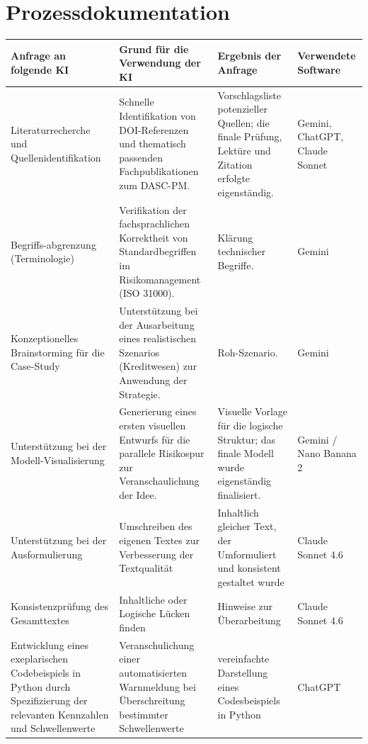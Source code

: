 \section{Prozessdokumentation}
\begin{center}
\small
\begin{tabular}{|p{3cm}|p{4.9cm}|p{3cm}|p{4.9cm}|}
    \hline
    \textbf{Anfrage an folgende KI} & \textbf{Grund für die Verwendung der KI} & \textbf{Ergebnis der Anfrage} & \textbf{Verwendete Software} \\
    \hline
    Literaturrecherche und Quellenidentifikation & Schnelle Identifikation von DOI-Referenzen und thematisch passenden Fachpublikationen zum DASC-PM. & Vorschlagsliste potenzieller Quellen; die finale Prüfung, Lektüre und Zitation erfolgte eigenständig. & Gemini, ChatGPT, Claude Sonnet \\
    \hline
    Begriffs-abgrenzung (Terminologie) & Verifikation der fachsprachlichen Korrektheit von Standardbegriffen im Risikomanagement (ISO 31000). & Klärung technischer Begriffe. & Gemini \\
    \hline
    Konzeptionelles Brainstorming für die Case-Study & Unterstützung bei der Ausarbeitung eines realistischen Szenarios (Kreditwesen) zur Anwendung der Strategie. & Roh-Szenario. & Gemini \\
    \hline
    Unterstützung bei der Modell-Visualisierung & Generierung eines ersten visuellen Entwurfs für die parallele Risikospur zur Veranschaulichung der Idee. & Visuelle Vorlage für die logische Struktur; das finale Modell wurde eigenständig finalisiert. & Gemini / Nano Banana 2 \\
    \hline
    Unterstützung bei der Ausformulierung & Umschreiben des eigenen Textes zur Verbesserung der Textqualität & Inhaltlich gleicher Text, der Umformuliert und konsistent gestaltet wurde & Claude Sonnet 4.6 \\
    \hline
    Konsistenzprüfung des Gesamttextes & Inhaltliche oder Logische Lücken finden & Hinweise zur Überarbeitung & Claude Sonnet 4.6 \\
    \hline
    Entwicklung eines exeplarischen Codebeispiels in Python durch Spezifizierung der relevanten Kennzahlen und Schwellenwerte & Veranschulichung einer automatisierten Warnmeldung bei Überschreitung bestimmter Schwellenwerte & vereinfachte Darstellung eines Codesbeispiels in Python & ChatGPT \\
    \hline
\end{tabular}

\end{center}